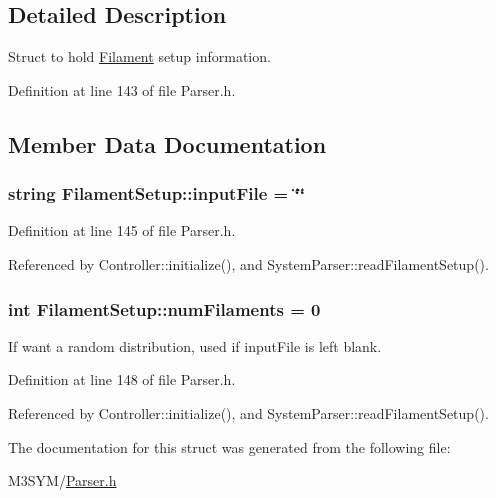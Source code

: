 \subsection{Detailed Description}
Struct to hold \hyperlink{classFilament}{Filament} setup information. 

Definition at line 143 of file Parser.\+h.



\subsection{Member Data Documentation}
\hypertarget{structFilamentSetup_a242b250121191fe69bceeb99a32de4f7}{
\subsubsection[{input\+File}]{\setlength{\rightskip}{0pt plus 5cm}string Filament\+Setup\+::input\+File = \char`\"{}\char`\"{}}}\label{structFilamentSetup_a242b250121191fe69bceeb99a32de4f7}


Definition at line 145 of file Parser.\+h.



Referenced by Controller\+::initialize(), and System\+Parser\+::read\+Filament\+Setup().

\hypertarget{structFilamentSetup_a0919341034ce0626e2de5fef2e7a6b66}{
\subsubsection[{num\+Filaments}]{\setlength{\rightskip}{0pt plus 5cm}int Filament\+Setup\+::num\+Filaments = 0}}\label{structFilamentSetup_a0919341034ce0626e2de5fef2e7a6b66}


If want a random distribution, used if input\+File is left blank. 



Definition at line 148 of file Parser.\+h.



Referenced by Controller\+::initialize(), and System\+Parser\+::read\+Filament\+Setup().



The documentation for this struct was generated from the following file\+:\begin{DoxyCompactItemize}
\item 
M3\+S\+Y\+M/\hyperlink{Parser_8h}{Parser.\+h}\end{DoxyCompactItemize}
